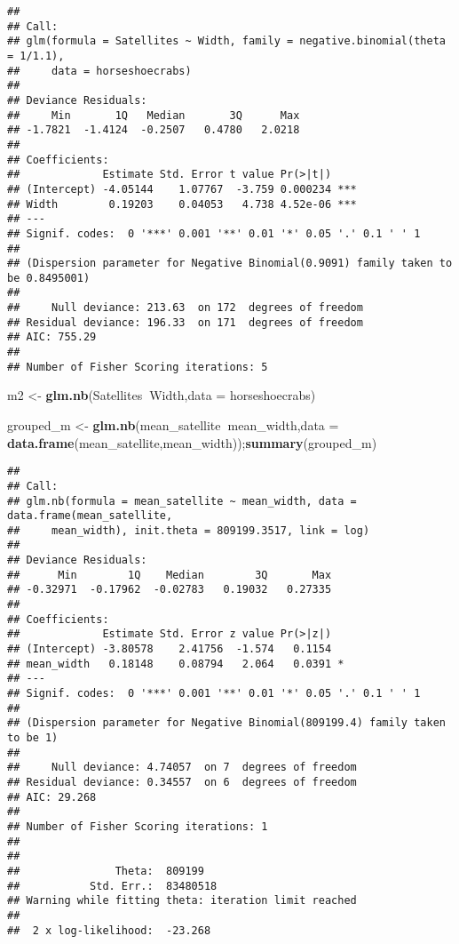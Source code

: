 \documentclass[12pt,hyperref,]{ctexart}
\newenvironment{Shaded}{\begin{snugshade}}{\end{snugshade}}
\newcommand{\DataTypeTok}[1]{\textcolor[rgb]{0.13,0.29,0.53}{#1}}
\newcommand{\KeywordTok}[1]{\textcolor[rgb]{0.13,0.29,0.53}{\textbf{#1}}}
\newcommand{\NormalTok}[1]{#1}
\newcommand{\OperatorTok}[1]{\textcolor[rgb]{0.81,0.36,0.00}{\textbf{#1}}}
\newcommand{\StringTok}[1]{\textcolor[rgb]{0.31,0.60,0.02}{#1}}
\begin{document}
\begin{verbatim}
## 
## Call:
## glm(formula = Satellites ~ Width, family = negative.binomial(theta = 1/1.1), 
##     data = horseshoecrabs)
## 
## Deviance Residuals: 
##     Min       1Q   Median       3Q      Max  
## -1.7821  -1.4124  -0.2507   0.4780   2.0218  
## 
## Coefficients:
##             Estimate Std. Error t value Pr(>|t|)    
## (Intercept) -4.05144    1.07767  -3.759 0.000234 ***
## Width        0.19203    0.04053   4.738 4.52e-06 ***
## ---
## Signif. codes:  0 '***' 0.001 '**' 0.01 '*' 0.05 '.' 0.1 ' ' 1
## 
## (Dispersion parameter for Negative Binomial(0.9091) family taken to be 0.8495001)
## 
##     Null deviance: 213.63  on 172  degrees of freedom
## Residual deviance: 196.33  on 171  degrees of freedom
## AIC: 755.29
## 
## Number of Fisher Scoring iterations: 5
\end{verbatim}

\begin{Shaded}
\begin{Highlighting}[]
\NormalTok{m2 <-}\StringTok{ }\KeywordTok{glm.nb}\NormalTok{(Satellites}\OperatorTok{~}\NormalTok{Width,}\DataTypeTok{data =}\NormalTok{ horseshoecrabs)}

\NormalTok{grouped_m <-}\StringTok{ }\KeywordTok{glm.nb}\NormalTok{(mean_satellite}\OperatorTok{~}\NormalTok{mean_width,}\DataTypeTok{data =} \KeywordTok{data.frame}\NormalTok{(mean_satellite,mean_width));}\KeywordTok{summary}\NormalTok{(grouped_m)}
\end{Highlighting}
\end{Shaded}

\begin{verbatim}
## 
## Call:
## glm.nb(formula = mean_satellite ~ mean_width, data = data.frame(mean_satellite, 
##     mean_width), init.theta = 809199.3517, link = log)
## 
## Deviance Residuals: 
##      Min        1Q    Median        3Q       Max  
## -0.32971  -0.17962  -0.02783   0.19032   0.27335  
## 
## Coefficients:
##             Estimate Std. Error z value Pr(>|z|)  
## (Intercept) -3.80578    2.41756  -1.574   0.1154  
## mean_width   0.18148    0.08794   2.064   0.0391 *
## ---
## Signif. codes:  0 '***' 0.001 '**' 0.01 '*' 0.05 '.' 0.1 ' ' 1
## 
## (Dispersion parameter for Negative Binomial(809199.4) family taken to be 1)
## 
##     Null deviance: 4.74057  on 7  degrees of freedom
## Residual deviance: 0.34557  on 6  degrees of freedom
## AIC: 29.268
## 
## Number of Fisher Scoring iterations: 1
## 
## 
##               Theta:  809199 
##           Std. Err.:  83480518 
## Warning while fitting theta: iteration limit reached 
## 
##  2 x log-likelihood:  -23.268
\end{verbatim}
\end{document}
